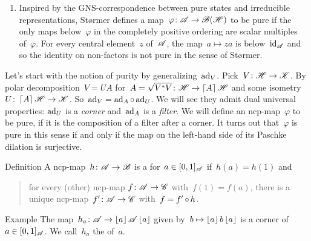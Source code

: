 \documentclass[b]{subfiles}
\begin{document}
\begin{parsec}
\begin{point}
\begin{point}
\begin{enumerate}
\item
Inspired by the GNS-correspondence between pure states and
    irreducible representations,
St\o rmer defines a map~$\varphi\colon \mathscr{A} \to \mathscr{B}(\mathscr{H})$ to be pure
    if the only maps below~$\varphi$ in the completely positive ordering
    are scalar multiples of~$\varphi$.
For every central element~$z$ of~$\mathscr{A}$,
    the map~$a \mapsto za$ is below~$\operatorname{id}_{\mathscr{A}}$
    and so the identity on non-factors is not pure in the sense
        of St\o rmer.
\end{enumerate}
\end{point}
\begin{point}%
Let's start with the notion of purity by generalizing~$\mathrm{ad}_V$.
Pick~$V \colon \mathscr{H} \to \mathscr{K}$.
By polar decomposition~$V = U A$
    for~$A = \sqrt{V^*V} \colon \mathscr{H} \to \left\lceil A\right\rceil \mathscr{H}$
    and some isometry~$U \colon \left\lceil A\right\rceil \mathscr{H} \to \mathscr{K}$.
So~$\mathrm{ad}_V = \mathrm{ad}_A \mathop{\circ} \mathrm{ad}_U$.
We will see they admit dual universal properties:
    $\mathrm{ad}_U$ is a \emph{corner}
    and~$\mathrm{ad}_A$ is a \emph{filter}.
We will define an ncp-map~$\varphi$ to be pure,
    if it is the composition of a filter after a corner.
It turns out that~$\varphi$ is pure in this sense
    if and only if the map on the left-hand side of
    its Paschke dilation is surjective.
\end{point}
\end{point}
\end{parsec}

\begin{parsec}%
\begin{point}{Definition}%
A ncp-map~$h \colon \mathscr{A} \to \mathscr{B}$
is a  for~$a \in [0,1]_{\mathscr{A}}$ if~$h(a)=h(1)$
    and
    \begin{quote}
        for every (other) ncp-map $f\colon \mathscr{A} \to \mathscr{C}$
            with~$f(1)=f(a)$,
            there is a unique ncp-map~$f'\colon \mathscr{A} \to \mathscr{C}$
            with~$f = f' \mathop{\circ} h$.
    \end{quote}
\end{point}
\begin{point}{Example}%
    The map~$h_a \colon \mathscr{A} \to \left\lfloor a\right\rfloor \mathscr{A} \left\lfloor a\right\rfloor$ given
    by~$b \mapsto \left\lfloor a\right\rfloor b \left\lfloor a\right\rfloor$
    is a corner of~$a \in [0,1]_{\mathscr{A}}$.
We call~$h_a$ the  of~$a$.    
\end{point}
\end{parsec}
\end{document}
